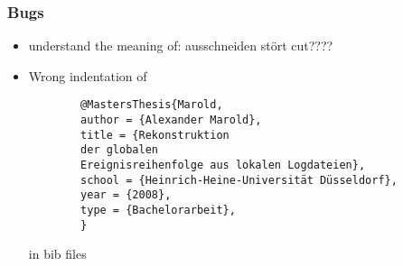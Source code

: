 \documentclass[10pt,a4paper,landscape]{report}
\begin{document}
\subsubsection{Bugs}
\begin{itemize}
	\item understand the meaning of: ausschneiden stört cut????
	\item Wrong indentation of \begin{verbatim}
		@MastersThesis{Marold,
		author = {Alexander Marold},
		title = {Rekonstruktion 
		der globalen 
		Ereignisreihenfolge aus lokalen Logdateien},
		school = {Heinrich-Heine-Universität Düsseldorf},
		year = {2008},
		type = {Bachelorarbeit},
		}
	\end{verbatim} in bib files
\end{itemize} 
\end{document}
